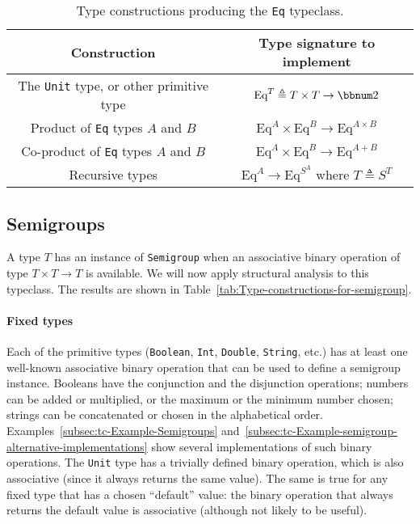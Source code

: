 \begin{table}
\begin{centering}
\begin{tabular}{|c|c|}
\hline 
\textbf{\footnotesize{}Construction} & \textbf{\footnotesize{}Type signature to implement}\tabularnewline
\hline 
\hline 
{\footnotesize{}The }\lstinline!Unit!{\footnotesize{} type, or other
primitive type} & {\footnotesize{}$\text{Eq}^{T}\triangleq T\times T\rightarrow\bbnum 2$}\tabularnewline
\hline 
{\footnotesize{}Product of }\lstinline!Eq!{\footnotesize{} types
$A$ and $B$} & {\footnotesize{}$\text{Eq}^{A}\times\text{Eq}^{B}\rightarrow\text{Eq}^{A\times B}$}\tabularnewline
\hline 
{\footnotesize{}Co-product of }\lstinline!Eq!{\footnotesize{} types
$A$ and $B$} & {\footnotesize{}$\text{Eq}^{A}\times\text{Eq}^{B}\rightarrow\text{Eq}^{A+B}$}\tabularnewline
\hline 
{\footnotesize{}Recursive types} & {\footnotesize{}$\text{Eq}^{A}\rightarrow\text{Eq}^{S^{A}}$ where
$T\triangleq S^{T}$}\tabularnewline
\hline 
\end{tabular}
\par\end{centering}
\caption{Type constructions producing the \lstinline!Eq! typeclass.\label{tab:Type-constructions-for-Eq}}
\end{table}


\subsection{Semigroups\label{subsec:Semigroups-constructions}}

A type $T$ has an instance of \lstinline!Semigroup! when an associative
binary operation of type $T\times T\rightarrow T$ is available. We
will now apply structural analysis to this typeclass. The results
are shown in Table~\ref{tab:Type-constructions-for-semigroup}.

\paragraph{Fixed types}

Each of the primitive types (\lstinline!Boolean!, \lstinline!Int!,
\lstinline!Double!, \lstinline!String!, etc.) has at least one well-known
associative binary operation that can be used to define a semigroup
instance. Booleans have the conjunction and the disjunction operations;
numbers can be added or multiplied, or the maximum or the minimum
number chosen; strings can be concatenated or chosen in the alphabetical
order. Examples~\ref{subsec:tc-Example-Semigroups} and~\ref{subsec:tc-Example-semigroup-alternative-implementations}
show several implementations of such binary operations. The \lstinline!Unit!
type has a trivially defined binary operation, which is also associative
(since it always returns the same value). The same is true for any
fixed type that has a chosen \textsf{``}default\textsf{''} value: the binary operation
that always returns the default value is associative (although not
likely to be useful).

